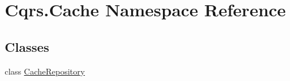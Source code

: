 \hypertarget{namespaceCqrs_1_1Cache}{}\section{Cqrs.\+Cache Namespace Reference}
\label{namespaceCqrs_1_1Cache}
\subsection*{Classes}
\begin{DoxyCompactItemize}
\item 
class \hyperlink{classCqrs_1_1Cache_1_1CacheRepository}{Cache\+Repository}
\end{DoxyCompactItemize}
